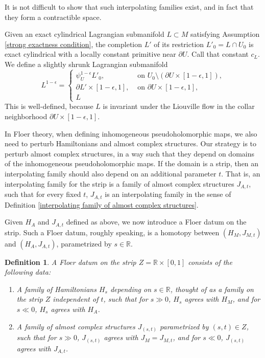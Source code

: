 \documentclass{amsart}
\newtheorem{definition}[theorem]{Definition}
\numberwithin{equation}{section}
\numberwithin{figure}{section}
\begin{document}
	It is not difficult to show that such interpolating families exist, and in fact that they form a contractible space. \par

	Given an exact cylindrical Lagrangian submanifold $L \subset M$ satisfying Assumption \ref{strong exactness condition}, the completion $L'$ of its restriction $L'_{0} = L \cap U_{0}$ is exact cylindrical with a locally constant primitive near $\partial U$. Call that constant $c_{L}$. We define a slightly shrunk Lagrangian submanifold
\begin{equation}\label{shrinking the Lagrangian submanifold}
L^{1-\epsilon} = 
\begin{cases}
\psi_{U}^{1-\epsilon} L'_{0}, &\text{ on } U_{0} \setminus (\partial U \times [1-\epsilon, 1]),\\
\partial L' \times [1-\epsilon, 1], &\text{ on } \partial U \times [1-\epsilon, 1],\\
L
\end{cases}
\end{equation}
This is well-defined, because $L$ is invariant under the Liouville flow in the collar neighborhood $\partial U \times [1-\epsilon, 1]$. \par
	In Floer theory, when defining inhomogeneous pseudoholomorphic maps, we also need to perturb Hamiltonians and almost complex structures. Our strategy is to perturb almost complex structures, in a way such that they depend on domains of the inhomogeneous pseudoholomorphic maps. If the domain is a strip, then an interpolating family should also depend on an additional parameter $t$. That is, an interpolating family for the strip is a family of almost complex structures $J_{A, t}$, such that for every fixed $t$, $J_{A, t}$ is an interpolating family in the sense of Definition \ref{interpolating family of almost complex structures}. \par
	Given $H_{A}$ and $J_{A, t}$ defined as above, we now introduce a Floer datum on the strip. Such a Floer datum, roughly speaking, is a homotopy between $(H_{M}, J_{M, t})$ and $(H_{A}, J_{A, t})$, parametrized by $s \in \mathbb{R}$. \par

\begin{definition}
	A Floer datum on the strip $Z = \mathbb{R} \times [0, 1]$ consists of the following data:
\begin{enumerate}[label=(\roman*)]

\item A family of Hamiltonians $H_{s}$ depending on $s \in \mathbb{R}$, thought of as a family on the strip $Z$ independent of $t$, such that for $s \gg 0$, $H_{s}$ agrees with $H_{M}$, and for $s \ll 0$, $H_{s}$ agrees with $H_{A}$.

\item A family of almost complex structures $J_{(s, t)}$ parametrized by $(s, t) \in Z$, such that for $s \gg 0$, $J_{(s, t)}$ agrees with $J_{M} = J_{M, t}$, and for $s \ll 0$, $J_{(s, t)}$ agrees with $J_{A, t}$.

\end{enumerate}
\end{definition}
\end{document}
